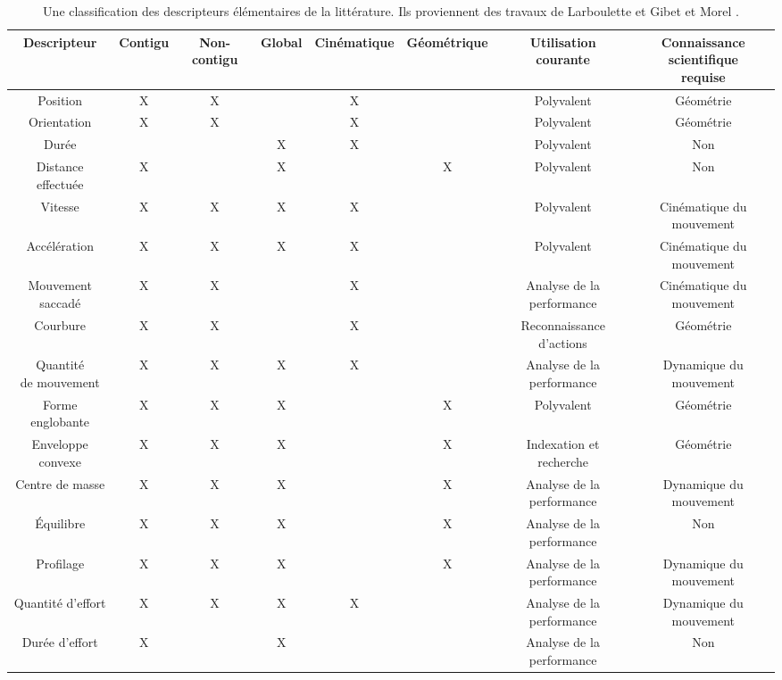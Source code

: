\begin{landscape}
\renewcommand{\arraystretch}{1.5}
\begin{table}[]
{\footnotesize
\begin{tabular}{c||c|c|c|c|c|c|c}
Descripteur & Contigu & Non-contigu & Global & Cinématique & Géométrique & \makecell[c]{Utilisation\\courante} & \makecell[c]{Connaissance\\scientifique\\requise} \\\hline
Position & X & X & & X & & Polyvalent & Géométrie \\\arrayrulecolor{gray}\hline
Orientation & X & X & & X & & Polyvalent & Géométrie \\\arrayrulecolor{gray}\hline
Durée & & & X & X & & Polyvalent & Non \\\arrayrulecolor{gray}\hline
\makecell[c]{Distance\\effectuée} & X & & X & & X & Polyvalent & Non \\\arrayrulecolor{gray}\hline
Vitesse & X & X & X & X & & Polyvalent & Cinématique du mouvement \\\arrayrulecolor{gray}\hline
Accélération & X & X & X & X & & Polyvalent & Cinématique du mouvement \\\arrayrulecolor{gray}\hline
\makecell[c]{Mouvement\\saccadé} & X & X & & X & & Analyse de la performance & Cinématique du mouvement\\\arrayrulecolor{gray}\hline
Courbure & X & X & & X & & Reconnaissance d'actions & Géométrie \\\arrayrulecolor{gray}\hline
\makecell[c]{Quantité\\de mouvement} & X & X & X & X & & Analyse de la performance & Dynamique du mouvement \\\arrayrulecolor{gray}\hline
Forme englobante & X & X & X & & X & Polyvalent & Géométrie \\\arrayrulecolor{gray}\hline
Enveloppe convexe & X & X & X & & X & Indexation et recherche & Géométrie \\\arrayrulecolor{gray}\hline
Centre de masse & X & X & X & & X & Analyse de la performance & Dynamique du mouvement \\\arrayrulecolor{gray}\hline
Équilibre & X & X & X & & X & Analyse de la performance & Non \\\arrayrulecolor{gray}\hline
Profilage & X & X & X & & X & Analyse de la performance & Dynamique du mouvement \\\arrayrulecolor{gray}\hline
Quantité d'effort & X & X & X & X & & Analyse de la performance & Dynamique du mouvement \\\arrayrulecolor{gray}\hline
Durée d'effort & X & & X & & & Analyse de la performance & Non
\end{tabular}
}
\caption[Classification des descripteurs élémentaires]{Une classification des descripteurs élémentaires de la littérature. Ils proviennent des travaux de Larboulette et Gibet \parencite{larboulette2015Descriptors} et Morel \parencite{Morel2017Mts}.}
\label{descriptors_classif}
\end{table}
\end{landscape}

